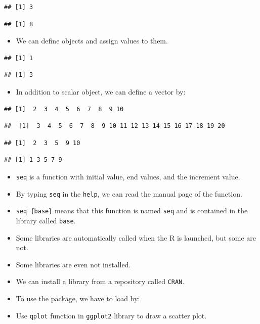 \documentclass[
]{book}
\providecommand{\tightlist}{%
  \setlength{\itemsep}{0pt}\setlength{\parskip}{0pt}}
\begin{document}
\begin{verbatim}
## [1] 3
\end{verbatim}

\begin{verbatim}
## [1] 8
\end{verbatim}

\begin{itemize}
\tightlist
\item
  We can define objects and assign values to them.
\end{itemize}

\begin{verbatim}
## [1] 1
\end{verbatim}

\begin{verbatim}
## [1] 3
\end{verbatim}

\begin{itemize}
\tightlist
\item
  In addition to scalar object, we can define a vector by:
\end{itemize}

\begin{verbatim}
## [1]  2  3  4  5  6  7  8  9 10
\end{verbatim}

\begin{verbatim}
##  [1]  3  4  5  6  7  8  9 10 11 12 13 14 15 16 17 18 19 20
\end{verbatim}

\begin{verbatim}
## [1]  2  3  5  9 10
\end{verbatim}

\begin{verbatim}
## [1] 1 3 5 7 9
\end{verbatim}

\begin{itemize}
\item
  \texttt{seq} is a function with initial value, end values, and the increment value.
\item
  By typing \texttt{seq} in the \texttt{help}, we can read the manual page of the function.
\item
  \texttt{seq\ \{base\}} means that this function is named \texttt{seq} and is contained in the library called \texttt{base}.
\item
  Some libraries are automatically called when the R is launched, but some are not.
\item
  Some libraries are even not installed.
\item
  We can install a library from a repository called \texttt{CRAN}.
\item
  To use the package, we have to load by:
\item
  Use \texttt{qplot} function in \texttt{ggplot2} library to draw a scatter plot.
\end{itemize}
\end{document}
